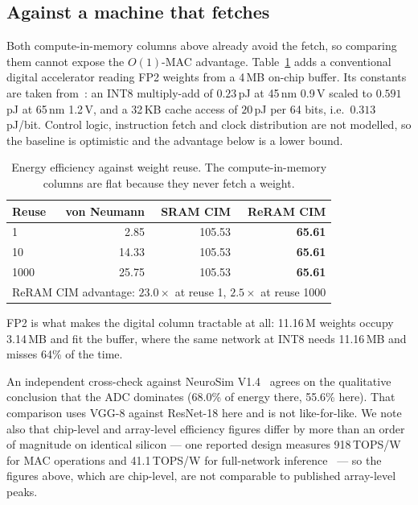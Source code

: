 \documentclass[conference,10pt]{IEEEtran}
\begin{document}
\subsection{Against a machine that fetches}

Both compute-in-memory columns above already avoid the fetch, so comparing
them cannot expose the $O(1)$-MAC advantage. Table~\ref{tab:vn} adds a
conventional digital accelerator reading FP2 weights from a 4\,MB on-chip
buffer. Its constants are taken from~\cite{horowitz}: an INT8 multiply-add of
$0.23$\,pJ at 45\,nm 0.9\,V scaled to $0.591$\,pJ at 65\,nm 1.2\,V, and a
32\,KB cache access of $20$\,pJ per 64 bits, i.e.\ $0.313$\,pJ/bit. Control
logic, instruction fetch and clock distribution are not modelled, so the
baseline is optimistic and the advantage below is a lower bound.

\begin{table}[t]
\centering
\caption{Energy efficiency against weight reuse. The compute-in-memory columns
are flat because they never fetch a weight.}
\label{tab:vn}
\begin{tabular}{lrrr}
\toprule
Reuse & von Neumann & SRAM CIM & \textbf{ReRAM CIM} \\
\midrule
1    & 2.85 & 105.53 & \textbf{65.61} \\
10   & 14.33 & 105.53 & \textbf{65.61} \\
1000 & 25.75 & 105.53 & \textbf{65.61} \\
\midrule
\multicolumn{4}{l}{ReRAM CIM advantage: $23.0\times$ at reuse 1,
$2.5\times$ at reuse 1000} \\
\bottomrule
\end{tabular}
\end{table}

FP2 is what makes the digital column tractable at all: 11.16\,M weights occupy
3.14\,MB and fit the buffer, where the same network at INT8 needs 11.16\,MB and
misses 64\% of the time.

An independent cross-check against NeuroSim V1.4~\cite{neurosim} agrees on the
qualitative
conclusion that the ADC dominates (68.0\% of energy there, 55.6\% here). That
comparison uses VGG-8 against ResNet-18 here and is not like-for-like. We note
also that chip-level and array-level efficiency figures differ by more than an
order of magnitude on identical silicon --- one reported design measures
918\,TOPS/W for MAC operations and 41.1\,TOPS/W for full-network
inference~\cite{facim} --- so the figures above, which are chip-level, are not
comparable to published array-level peaks.
\end{document}
